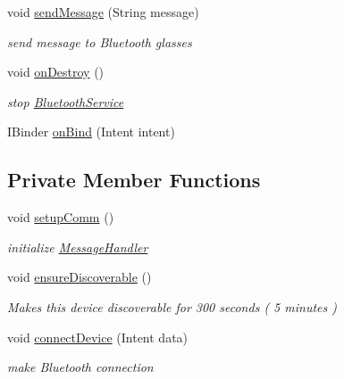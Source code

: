 \begin{DoxyCompactItemize}
void \mbox{\hyperlink{classhi_1_1world_1_1hello_1_1myapplication_1_1_message_handler_a74619443552d00df9fd4a28843c796a5}{send\+Message}} (String message)
\begin{DoxyCompactList}\small\item\em send message to Bluetooth glasses \end{DoxyCompactList}\item 
void \mbox{\hyperlink{classhi_1_1world_1_1hello_1_1myapplication_1_1_message_handler_ac04318416c0448542c24121beb9668a0}{on\+Destroy}} ()
\begin{DoxyCompactList}\small\item\em stop \mbox{\hyperlink{classhi_1_1world_1_1hello_1_1myapplication_1_1_bluetooth_service}{Bluetooth\+Service}} \end{DoxyCompactList}\item 
I\+Binder \mbox{\hyperlink{classhi_1_1world_1_1hello_1_1myapplication_1_1_message_handler_a12ab4afbaf4ba53b6d46a0d3db87df59}{on\+Bind}} (Intent intent)
\end{DoxyCompactItemize}
\subsection*{Private Member Functions}
\begin{DoxyCompactItemize}
\item 
void \mbox{\hyperlink{classhi_1_1world_1_1hello_1_1myapplication_1_1_message_handler_a28dc0a4d1a62315046772ed20815d723}{setup\+Comm}} ()
\begin{DoxyCompactList}\small\item\em initialize \mbox{\hyperlink{classhi_1_1world_1_1hello_1_1myapplication_1_1_message_handler}{Message\+Handler}} \end{DoxyCompactList}\item 
void \mbox{\hyperlink{classhi_1_1world_1_1hello_1_1myapplication_1_1_message_handler_a94ef40e803137d2022f1ec0408ee7868}{ensure\+Discoverable}} ()
\begin{DoxyCompactList}\small\item\em Makes this device discoverable for 300 seconds ( 5 minutes ) \end{DoxyCompactList}\item 
void \mbox{\hyperlink{classhi_1_1world_1_1hello_1_1myapplication_1_1_message_handler_a345ec9cdc760728388f6c2d6d5c21962}{connect\+Device}} (Intent data)
\begin{DoxyCompactList}\small\item\em make Bluetooth connection \end{DoxyCompactList}\end{DoxyCompactItemize}
